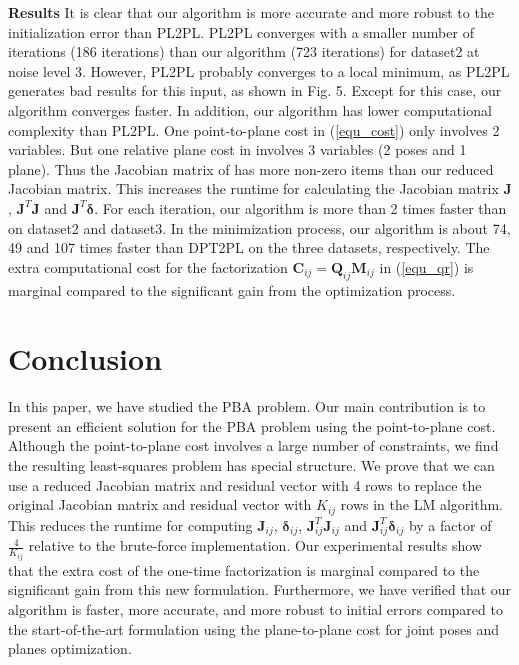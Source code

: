 \documentclass{vgtc}                          %
\begin{document}
\textbf{Results} \quad  It is clear that our algorithm is more accurate and more robust to the initialization error than  PL2PL\cite{geneva2018lips}.  PL2PL converges with a smaller number of iterations (186 iterations) than our algorithm (723 iterations) for dataset2 at noise level 3. However, PL2PL probably converges to a local minimum, as PL2PL generates bad results for this input, as shown in Fig. 5. Except for this case, our algorithm converges faster. In addition, our algorithm has lower computational complexity than PL2PL\cite{geneva2018lips}. One point-to-plane cost in (\ref{equ_cost}) only involves 2 variables. But one relative plane cost  in \cite{geneva2018lips}    involves  3 variables (2 poses and 1 plane). Thus the Jacobian matrix of  \cite{geneva2018lips} has  more non-zero items than our reduced Jacobian matrix. 
This increases the runtime  for calculating the Jacobian matrix $\mathbf{J}$,   $\mathbf{J}^{T}\mathbf{J}$ and $\mathbf{J}^{T}\bm{\delta} $. For each iteration, our algorithm is more than 2 times faster than \cite{geneva2018lips} on dataset2 and dataset3. In the minimization process, our algorithm is about 74, 49 and  107 times faster than DPT2PL on the three datasets, respectively.
 The extra computational cost for the factorization $\mathbf{C}_{ij} = \mathbf{Q}_{ij}\mathbf{M}_{ij}$ in (\ref{equ_qr}) is marginal compared to the significant gain from the optimization process. 

\section{Conclusion}
In this paper, we have studied the PBA problem. Our main contribution is to present an efficient solution for the PBA problem using the point-to-plane cost. Although the point-to-plane cost involves a large number of constraints, we find the resulting least-squares problem has  special structure.  We prove that we can use  a reduced Jacobian matrix and  residual vector  with 4 rows to replace the original Jacobian matrix and residual vector with $K_{ij}$ rows in the LM algorithm. This reduces the runtime for computing $\mathbf{J}_{ij}$, $\bm{\delta}_{ij}$, $\mathbf{J}_{ij}^{T}\mathbf{J}_{ij}$ and $\mathbf{J}_{ij}^{T}\bm{\delta}_{ij}$  by a factor of $\frac{4}{K_{ij}}$ relative to the brute-force implementation. Our experimental results show that the extra cost of the one-time  factorization is marginal compared to the significant gain from this new formulation. Furthermore, we have verified that our algorithm is faster,  more accurate, and more robust to initial errors compared to the start-of-the-art  formulation using  the plane-to-plane cost for joint poses and planes optimization\cite{geneva2018lips}.


%

%
%
%


\end{document}
